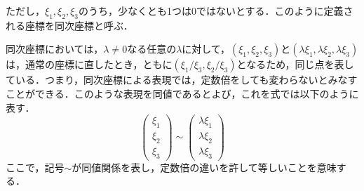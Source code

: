 \documentclass[openright]{nitocs}
\numberwithin{equation}{section}
\begin{document}
                ただし，$\xi_1,\xi_2,\xi_3$のうち，少なくとも1つは0ではないとする．このように定義される座標を同次座標と呼ぶ\cite{DIP}．

                同次座標においては，$\lambda\neq0$なる任意の$\lambda$に対して，$(\xi_1,\xi_2,\xi_3)$と$(\lambda\xi_1,\lambda\xi_2,\lambda\xi_3)$は，通常の座標に直したとき，ともに$(\xi_1/\xi_3,\xi_2/\xi_3)$となるため，同じ点を表している．つまり，同次座標による表現では，定数倍をしても変わらないとみなすことができる．このような表現を同値であるとよび，これを式では以下のように表す．
                \begin{equation} %
                    \left(
                        \begin{array}{ccc}
                            \xi_1\\
                            \xi_2\\
                            \xi_3
                        \end{array}
                    \right) \sim %
                    \left(
                        \begin{array}{ccc}
                            \lambda\xi_1\\
                            \lambda\xi_2\\
                            \lambda\xi_3
                        \end{array}
                    \right)
                \end{equation}
                ここで，記号$\sim$が同値関係を表し，定数倍の違いを許して等しいことを意味する．

\end{document}
